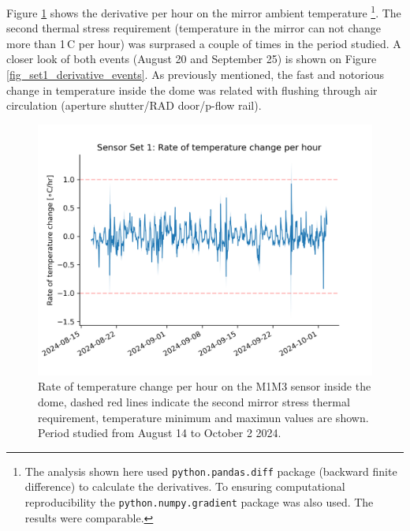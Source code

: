 \documentclass[SE,lsstdraft,authoryear,toc]{lsstdoc}
\begin{document}
Figure \ref{fig_set1_derivative} shows the derivative per hour on the mirror ambient temperature \footnote{The analysis shown here used \texttt{python.pandas.diff} package (backward finite difference) to calculate the derivatives. To ensuring computational reproducibility the \texttt{python.numpy.gradient} package was also used. The results were comparable.}. The second thermal stress requirement (temperature in the mirror can not change more than 1\,\textdegree C per hour) was surprased a couple of times in the period studied. A closer look of both events (August 20 and September 25) is shown on Figure \ref{fig_set1_derivative_events}. As previously mentioned, the fast and notorious change in temperature inside the dome was related with flushing through air circulation (aperture shutter/RAD door/p-flow rail).

\begin{figure}[h!]
  \centering
  \includegraphics[width=12cm]{SITCOMTN-141_figures/Sensor1_1h_temp_derivative.png}
  \caption{Rate of temperature change per hour on the M1M3 sensor inside the dome, dashed red lines indicate the second mirror stress thermal requirement, temperature minimum and maximun values are shown. Period studied from August 14 to October 2 2024. }
  \label{fig_set1_derivative}
\end{figure}
\end{document}
